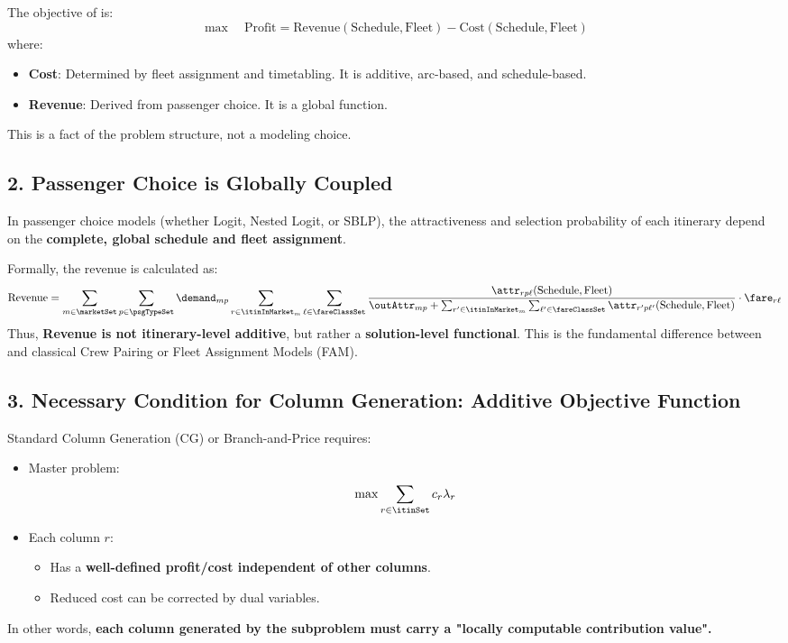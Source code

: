 The objective of \problemName is:
\[
\max \quad \text{Profit} = \text{Revenue}(\text{Schedule}, \text{Fleet}) - \text{Cost}(\text{Schedule}, \text{Fleet})
\]
where:
\begin{itemize}
    \item \textbf{Cost}: Determined by fleet assignment and timetabling. It is additive, arc-based, and schedule-based.
    \item \textbf{Revenue}: Derived from passenger choice. It is a global function.
\end{itemize}
This is a fact of the problem structure, not a modeling choice.

\subsection*{2. Passenger Choice is Globally Coupled}

In passenger choice models (whether Logit, Nested Logit, or SBLP), the attractiveness and selection probability of each itinerary depend on the \textbf{complete, global schedule and fleet assignment}.

Formally, the revenue is calculated as:
\[
\text{Revenue} = \sum_{m \in \marketSet} \sum_{p \in \psgTypeSet} \demand_{mp} \sum_{r \in \itinInMarket_m} \sum_{\ell \in \fareClassSet} \frac{\attr_{rp\ell}(\text{Schedule}, \text{Fleet})}{\outAttr_{mp} + \sum_{r' \in \itinInMarket_m} \sum_{\ell' \in \fareClassSet} \attr_{r'p\ell'}(\text{Schedule}, \text{Fleet})} \cdot \fare_{r\ell}
\]
Thus, \textbf{Revenue is not itinerary-level additive}, but rather a \textbf{solution-level functional}. This is the fundamental difference between \problemName and classical Crew Pairing or Fleet Assignment Models (FAM).

\subsection*{3. Necessary Condition for Column Generation: Additive Objective Function}

Standard Column Generation (CG) or Branch-and-Price requires:
\begin{itemize}
    \item Master problem:
    \[
    \max \sum_{r \in \itinSet} c_r \lambda_r
    \]
    \item Each column $r$:
    \begin{itemize}
        \item Has a \textbf{well-defined profit/cost independent of other columns}.
        \item Reduced cost can be corrected by dual variables.
    \end{itemize}
\end{itemize}
In other words, \textbf{each column generated by the subproblem must carry a "locally computable contribution value".}

